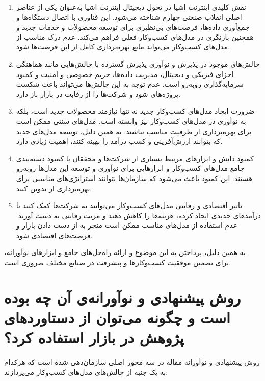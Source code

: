 \documentclass[10pt, twocolumn]{article}
\begin{document}
\begin{enumerate}
\item 
نقش کلیدی اینترنت اشیا  در تحول دیجیتال  
   اینترنت اشیا به‌عنوان یکی از عناصر اصلی انقلاب صنعتی چهارم شناخته می‌شود. این فناوری با اتصال دستگاه‌ها و جمع‌آوری داده‌ها، فرصت‌های بی‌نظیری برای توسعه محصولات و خدمات جدید و همچنین بازنگری در مدل‌های کسب‌وکار فعلی فراهم می‌کند. عدم درک مناسب از مدل‌های کسب‌وکار  می‌تواند مانع بهره‌برداری کامل از این فرصت‌ها شود.  

\item 
چالش‌های موجود در پذیرش و نوآوری   
   پذیرش گسترده  با چالش‌هایی مانند هماهنگی اجزای فیزیکی و دیجیتال، مدیریت داده‌ها، حریم خصوصی و امنیت و کمبود سرمایه‌گذاری روبه‌رو است. عدم توجه به این چالش‌ها می‌تواند باعث شکست پروژه‌های  شود و شرکت‌ها را از رقابت در بازار باز دارد.  

\item 
ضرورت ایجاد مدل‌های کسب‌وکار جدید  
    نه تنها نیازمند محصولات جدید است، بلکه به نوآوری در مدل‌های کسب‌وکار نیز وابسته است. مدل‌های سنتی ممکن است برای بهره‌برداری از ظرفیت  مناسب نباشند. به همین دلیل، توسعه مدل‌های جدید که بتوانند ارزش‌آفرینی و کسب درآمد را بهینه کنند، اهمیت زیادی دارد.  

\item 
کمبود دانش و ابزارهای مرتبط  
   بسیاری از شرکت‌ها و محققان با کمبود دسته‌بندی جامع مدل‌های کسب‌وکار  و ابزارهایی برای نوآوری و توسعه این مدل‌ها روبه‌رو هستند. این کمبود باعث می‌شود که سازمان‌ها نتوانند استراتژی‌های مناسبی برای بهره‌برداری از  تدوین کنند.  

\item 
تاثیر اقتصادی و رقابتی  
   مدل‌های کسب‌وکار  می‌توانند به شرکت‌ها کمک کنند تا درآمدهای جدیدی ایجاد کرده، هزینه‌ها را کاهش دهند و مزیت رقابتی به دست آورند. عدم استفاده از مدل‌های مناسب ممکن است منجر به از دست دادن بازار و فرصت‌های اقتصادی شود.  
\end{enumerate}

به همین دلیل، پرداختن به این موضوع و ارائه راه‌حل‌های جامع و ابزارهای نوآورانه، برای تضمین موفقیت کسب‌وکارها و پیشرفت  در صنایع مختلف ضروری است.
\section{روش پیشنهادی و نوآورانه‌ی آن چه بوده است و چگونه می‌توان از دستاورد‌های پژوهش در بازار استفاده کرد؟}
روش پیشنهادی و نوآورانه مقاله در سه محور اصلی سازمان‌دهی شده است که هرکدام به یک جنبه از چالش‌های مدل‌های کسب‌وکار  می‌پردازند:  
\end{document}
